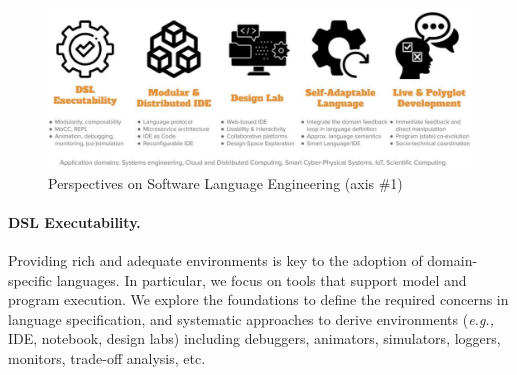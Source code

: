 \begin{figure}[h]
\centering
\includegraphics[width=\columnwidth]{IMG/sle.pdf}
\caption{Perspectives on Software Language Engineering (axis \#1)}
\label{fig:perspectives-sle}
\end{figure}

\paragraph{DSL Executability.} Providing rich and adequate environments is key to the adoption of domain-specific languages. In particular, we focus on tools that support model and program execution. We explore the foundations to define the required concerns in language specification, and systematic approaches to derive environments (\emph{e.g.,} IDE, notebook, design labs) including debuggers, animators, simulators, loggers, monitors, trade-off analysis, etc.


